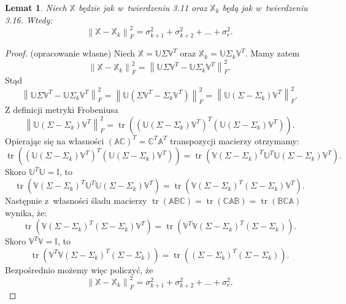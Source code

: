 \documentclass[12pt,a4paper]{report}
\newtheorem{lemat}[df]{Lemat}
\newcommand{\norma}[1]{\left\| {#1} \right\|}
\newcommand{\tr}[1]{\operatorname{tr}\left({#1} \right)}
\begin{document}
\begin{lemat}
Niech $\mathbb{X}$ będzie jak w~twierdzeniu 3.11 oraz $\mathbb{X}_k$ będą jak w~twierdzeniu 3.16.
Wtedy:
$$
\norma{ \mathbb{X} - \mathbb{X}_k}_F^2 = \sigma_{k+1}^2 + \sigma_{k+2}^2 + \ldots + \sigma_{r}^2.
$$
\end{lemat}
\begin{proof}(opracowanie własne)
Niech $\mathbb{X}=\mathbb{U} \Sigma \mathbb{V}^T$ oraz $\mathbb{X}_k=\mathbb{U} \Sigma_k \mathbb{V}^T$.
Mamy zatem
$$
\norma{ \mathbb{X} - \mathbb{X}_k}_F^2 =
\norma{\mathbb{U} \Sigma \mathbb{V}^T - \mathbb{U} \Sigma_k \mathbb{V}^T}_F^2.
$$
Stąd
$$
\norma{\mathbb{U} \Sigma \mathbb{V}^T - \mathbb{U} \Sigma_k \mathbb{V}^T}_F^2 = 
\norma{\mathbb{U} (\Sigma \mathbb{V}^T - \Sigma_k \mathbb{V}^T)}_F^2 = 
\norma{\mathbb{U} (\Sigma - \Sigma_k) \mathbb{V}^T}_F^2.
$$
Z definicji metryki Frobeniusa
$$
\norma{\mathbb{U} (\Sigma - \Sigma_k) \mathbb{V}^T}_F^2 = 
\tr{(\mathbb{U} (\Sigma - \Sigma_k) \mathbb{V}^T)^T (\mathbb{U} (\Sigma - \Sigma_k) \mathbb{V}^T)}.
$$
Opierając się na własności $(\mathbb{A}\mathbb{C})^T = \mathbb{C}^T \mathbb{A}^T$ transpozycji macierzy otrzymamy:
$$
\tr{(\mathbb{U} (\Sigma - \Sigma_k) \mathbb{V}^T)^T (\mathbb{U} (\Sigma - \Sigma_k) \mathbb{V}^T)} = \tr{\mathbb{V} (\Sigma - \Sigma_k)^T \mathbb{U}^T \mathbb{U} (\Sigma - \Sigma_k) \mathbb{V}^T}.
$$
Skoro $\mathbb{U}^T \mathbb{U} = \mathbb{I}$, to
$$
\tr{\mathbb{V} (\Sigma - \Sigma_k)^T \mathbb{U}^T \mathbb{U} (\Sigma - \Sigma_k) \mathbb{V}^T} = 
\tr{\mathbb{V} (\Sigma - \Sigma_k)^T (\Sigma - \Sigma_k) \mathbb{V}^T}.
$$
Następnie z~własności śladu macierzy $\tr{\mathbb{A} \mathbb{B} \mathbb{C}}  = \tr{\mathbb{C} \mathbb{A} \mathbb{B}} = \tr{\mathbb{B} \mathbb{C} \mathbb{A}}$ wynika, że:
$$
\tr{\mathbb{V} (\Sigma - \Sigma_k)^T (\Sigma - \Sigma_k) \mathbb{V}^T} = \tr{\mathbb{V}^T \mathbb{V} (\Sigma - \Sigma_k)^T (\Sigma - \Sigma_k)}.
$$ 
Skoro $\mathbb{V}^T \mathbb{V} = \mathbb{I}$, to
$$
\tr{\mathbb{V}^T \mathbb{V} (\Sigma - \Sigma_k)^T (\Sigma - \Sigma_k)} = \tr{(\Sigma - \Sigma_k)^T (\Sigma - \Sigma_k) }.
$$
Bezpośrednio możemy więc policzyć, że
$$
\norma{ \mathbb{X} - \mathbb{X}_k}_F^2 = \sigma_{k+1}^2 + \sigma_{k+2}^2 + \ldots + \sigma_{r}^2.
$$
\end{proof}
\end{document}
